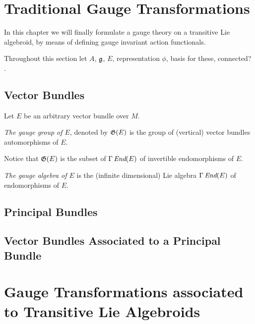 \section{Traditional Gauge Transformations}

In this chapter we will finally formulate a gauge theory on a transitive Lie algebroid, by means of defining gauge invariant action functionals.

Throughout this section let $A$, $\mathfrak{g}$, $E$, representation $\phi$, basis for these, connected? .

\subsection{Vector Bundles}

Let $E$ be an arbitrary vector bundle over $M$.

\begin{definition}
\emph{The gauge group of $E$}, denoted by $\mathfrak{G}(E)$ is the group of (vertical) vector bundles automorphisms of $E$.
\end{definition}

Notice that $\mathfrak{G}(E)$ is the subset of $\Gamma\operatorname{\textit{End}}(E)$ of invertible endomorphisms of $E$.

{
\color{gray}
\begin{definition}
\emph{The gauge algebra of $E$} is the (infinite dimensional) Lie algebra $\Gamma\operatorname{\textit{End}}(E)$ of endomorphisms of $E$.
\end{definition}
}

\subsection{Principal Bundles}

\subsection{Vector Bundles Associated to a Principal Bundle}


\section{Gauge Transformations associated to Transitive Lie Algebroids}

